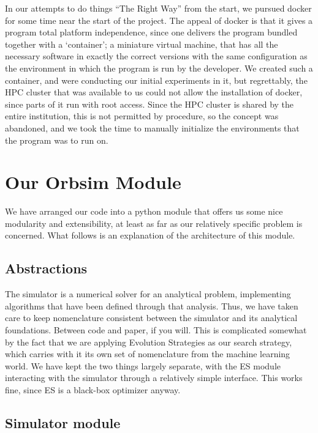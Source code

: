 In our attempts to do things ``The Right Way'' from the start, we pursued docker for some time near the start of the project. The appeal of docker is that it gives a program total platform independence, since one delivers the program bundled together with a `container'; a miniature virtual machine, that has all the necessary software in exactly the correct versions with the same configuration as the environment in which the program is run by the developer. We created such a container, and were conducting our initial experiments in it, but regrettably, the HPC cluster that was available to us could not allow the installation of docker, since parts of it run with root access. Since the HPC cluster is shared by the entire institution, this is not permitted by procedure, so the concept was abandoned, and we took the time to manually initialize the environments that the program was to run on.


\section{Our Orbsim Module}

We have arranged our code into a python module that offers us some nice modularity and extensibility, at least as far as our relatively specific problem is concerned. What follows is an explanation of the architecture of this module.

\subsection{Abstractions}

The simulator is a numerical solver for an analytical problem, implementing algorithms that have been defined through that analysis. Thus, we have taken care to keep nomenclature consistent between the simulator and its analytical foundations. Between code and paper, if you will. This is complicated somewhat by the fact that we are applying Evolution Strategies as our search strategy, which carries with it its own set of nomenclature from the machine learning world. We have kept the two things largely separate, with the ES module interacting with the simulator through a relatively simple interface. This works fine, since ES is a black-box optimizer anyway.

\subsection{Simulator module}

